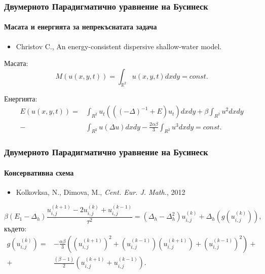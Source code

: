 \documentclass{beamer}
\newcommand{\RR}{\mathbb{R}}
\begin{document}
\begin{frame}
\frametitle{Двумерното Парадигматично уравнение на Бусинеск}
\framesubtitle{Масата и енергията за непрекъснатата задача }
\begin{itemize}
\item {\footnotesize Christov C., An energy-consistent dispersive shallow-water model.}
\end{itemize}
Масата:
\begin{equation}\label{intM}
M(u(x,y,t))=\int_{\RR^2} u(x,y,t)dx dy = const.
\end{equation}

Енергията:
\begin{align}\label{ex-en}
E(u(x,y,t)) = &\int_{R^2} u_t \left(((-\Delta)^{-1}+E)u_t\right) dxdy+
\beta \int_{R^2} u^2 dxdy \nonumber\\
-& \int_{R^2}u \left(\Delta u\right) dxdy
-\frac{2 \alpha \beta}{3} \int_{R^2} u^3 dxdy =const.
\end{align}

\end{frame}

\begin{frame}
\frametitle{Двумерното Парадигматично уравнение на Бусинеск}
\framesubtitle{Консервативна схема}
\begin{itemize}
\footnotesize
\item Kolkovksa, N., Dimova, M., {\it Cent. Eur. J. Math.}, 2012
\end{itemize}

\begin{equation}\label{consFDS}
\beta (E_1-\Delta_h)\frac{ u^{(k+1)}_{i, j} - 2u^{(k)}_{i,j} + u^{(k-1)}_{i,j} }{\tau^2} = (\Delta_h - \Delta_h^2)u^{(k)}_{i,j} + \Delta_h(g(u^{(k)}_{i,j})),
\end{equation}
където:
\begin{align}
g(u^{(k)}_{i,j})=& -\frac{\alpha \beta} { 3 } \left( (u^{(k+1)}_{i,j})^2 + (u^{(k-1)}_{i,j})(u^{(k+1)}_{i,j}) + (u^{(k-1)}_{i,j})^2 \right) + \nonumber\\
+&\frac{ (\beta - 1 )}{ 2 }\left( u^{(k+1)}_{i,j} + u^{(k-1)}_{i,j} \right).
\end{align}
\end{frame}

\end{document}
